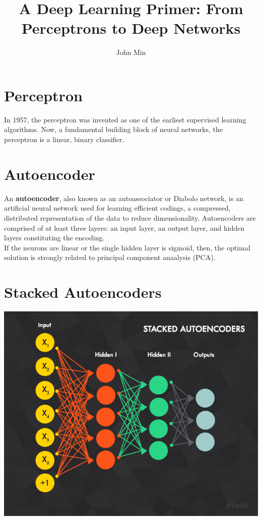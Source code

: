 \documentclass{article}
\author{John Min}
\title{A Deep Learning Primer: From Perceptrons to Deep Networks}
\begin{document}
\maketitle

\section{Perceptron}

In 1957, the perceptron was invented as one of the earliest supervised learning algorithms.  Now, a fundamental building block of neural networks, the perceptron is a linear, binary classifier.\\

\section{Autoencoder}
An \textbf{autoencoder}, also known as an autoassociator or Diabolo network, is an artificial neural network used for learning efficient codings, a compressed, distributed representation of the data to reduce dimensionality.  Autoencoders are comprised of at least three layers: an input layer, an output layer, and hidden layers constituting the encoding.\\

\noindent
If the neurons are linear or the single hidden layer is sigmoid, then, the optimal solution is strongly related to principal component anaalysis (PCA).


\section{Stacked Autoencoders}
\includegraphics[scale=0.5]{Stacked_Autoencoders.png} \\
\end{document}
